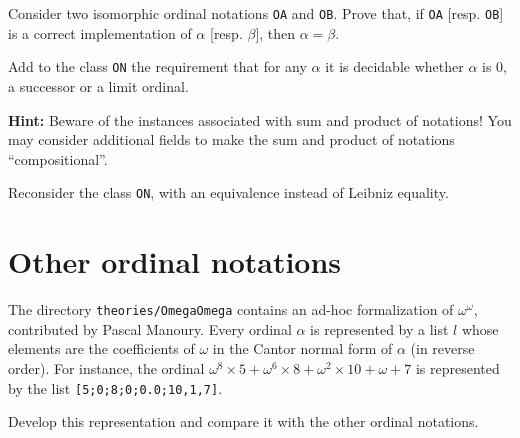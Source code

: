 \begin{project}
Consider two isomorphic ordinal notations \texttt{OA} and \texttt{OB}.
Prove that, if \texttt{OA} [resp. \texttt{OB}] is a correct implementation 
of $\alpha$ [resp. $\beta$], then $\alpha=\beta$.
\end{project}


\begin{project}
\label{project:succ-limit-dec}
Add to the class \texttt{ON} the requirement that for any $\alpha$ it is decidable whether $\alpha$ is $0$, a successor or a limit ordinal.


\textbf{Hint:}   Beware of the instances associated with sum and product of notations!
  You may consider additional fields 
to make the sum and product of notations ``compositional''.

\end{project}

\begin{project}
\label{project:on-setoid}
Reconsider the  class \texttt{ON}, with an equivalence instead of Leibniz equality.
\end{project}






\section{Other ordinal notations}


\begin{project}
The directory \texttt{theories/OmegaOmega} contains an ad-hoc formalization of $\omega^\omega$, contributed by Pascal Manoury. Every ordinal $\alpha$ is represented by a list $l$ whose elements are the coefficients of $\omega$ in  the Cantor normal form of $\alpha$ (in reverse order). For instance, the ordinal 
$\omega^{8}\times 5 + \omega^{6}\times 8 + \omega^2\times 10 + \omega + 7$ is represented by the list \texttt{[5;0;8;0;0.0;10,1,7]}. 


 Develop this representation and compare it with the other ordinal notations.



\end{project}


